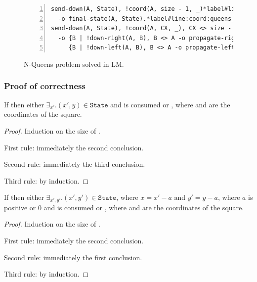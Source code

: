 \begin{figure}[h!]
\begin{Verbatim}[numbers=left,fontsize=\scriptsize,commandchars=\*\#\&]
send-down(A, State), !coord(A, size - 1, _)*label#line:coord:queens_complete1&
  -o final-state(A, State).*label#line:coord:queens_complete2&
send-down(A, State), !coord(A, CX, _), CX <> size - 1*label#line:coord:queens_down1&
  -o {B | !down-right(A, B), B <> A -o propagate-right(B, State)},
     {B | !down-left(A, B), B <> A -o propagate-left(B, State)}.*label#line:coord:queens_down2&
\end{Verbatim}
  \caption{N-Queens problem solved in LM.}
  \label{code:coordination:nqueens}
\end{figure}


\subsubsection{Proof of correctness}

\begin{lemma}

If  then either $\exists_{x'}. {(x',
y) \in \mathtt{State}}$ and  is consumed or
, where
 and  are the coordinates of the square.

\end{lemma}
\begin{proof}
Induction on the size of .

First rule: immediately the second conclusion.

Second rule: immediately the third conclusion.

Third rule: by induction.
\end{proof}

\begin{lemma}
If  then either $\exists_{x', y'}. {(x', y') \in \mathtt{State}}$, where $x = x' - a$ and $y' = y - a$, where $a$ is positive or $0$ and  is consumed or , where  and  are the coordinates of the square.
\end{lemma}
\begin{proof}
Induction on the size of .

First rule: immediately the second conclusion.

Second rule: immediately the first conclusion.

Third rule: by induction.
\end{proof}

